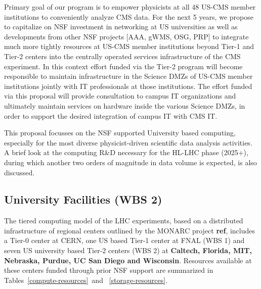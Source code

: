 \documentclass[11pt,a4paper]{article}
\begin{document}
Primary goal of our program is to empower physicists at all 48 US-CMS member institutions 
to conveniently analyze CMS data. %
For the next 5 years, we propose to capitalize on NSF investment in networking at US universities
as well as developments from other NSF projects [AAA, gWMS, OSG, PRP]
to integrate much more tightly resources at US-CMS member institutions beyond Tier-1 and Tier-2 centers
into the centrally operated services infrastructure of the CMS experiment.
In this context effort funded via the Tier-2 program will become responsible to maintain
infrastructure in the Science DMZs of US-CMS member institutions jointly with IT professionals at those institutions.
The effort funded via this proposal will provide consultation to campus IT organizations and ultimately maintain services
on hardware inside the various Science DMZs, in order to support the desired integration of campus IT with CMS IT.


This proposal focusses on the NSF supported University
based computing, especially for the most diverse %
physicist-driven
scientific data analysis activities. A brief look at the computing 
R\&D necessary for the HL-LHC phase (2025+), during which 
another two orders of magnitude in data volume is expected, 
is also discussed.

\subsection{University Facilities (WBS 2)}

The tiered computing model of the LHC experiments, based on a 
distributed infrastructure of regional centers outlined by
the MONARC project {\bf ref}, includes a Tier-0 center at CERN,
one US based Tier-1 center at FNAL (WBS 1) and seven US 
university based Tier-2 centers (WBS 2) at 
{\bf Caltech, Florida, MIT, Nebraska, Purdue, UC San Diego and Wisconsin}.
Resources available at these centers funded through prior NSF
support are summarized in Tables~\ref{compute-resources}~and~
\ref{storage-resources}.
\end{document}
